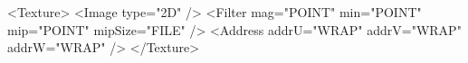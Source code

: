 <Texture>
    <Image type="2D" />
    <Filter mag="POINT" min="POINT" mip="POINT" mipSize="FILE" />
    <Address addrU="WRAP" addrV="WRAP" addrW="WRAP" />
</Texture>

